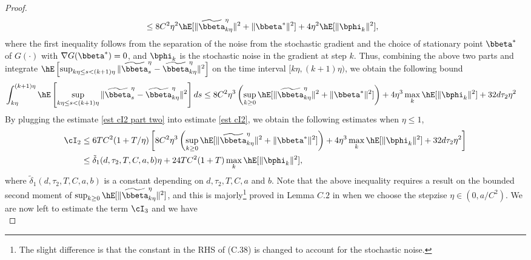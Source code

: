 \begin{proof}
\begin{equation*}
\begin{split}
   &\le 8C^2\eta^2\hE[\|\widetilde \bbeta^{\eta}_{k\eta}\|^2+\|\bbeta^*\|^2]+4\eta^2\hE[\|\bphi_k\|^2 ],
    \end{split}{}
\end{equation*}
where the first inequality follows from the separation of the noise from the stochastic gradient and the choice of stationary point $\bbeta^*$ of $G(\cdot)$ with $\nabla G(\bbeta^*)=0$, and $\bphi_k$ is the stochastic noise in the gradient at step $k$. Thus, combining the above two parts and integrate $ \hE\left[\sup_{k\eta\le s<(k+1)\eta}  \| \widetilde \bbeta^{\eta}_s-\widetilde \bbeta^{\eta}_{k\eta}\|^2 \right]$ on the time interval $[k\eta,(k+1)\eta)$, we obtain the following bound 
\begin{equation}\label{est cI2 part two}
    \begin{split}
        \int_{k\eta}^{(k+1)\eta}  \hE\left[\sup_{k\eta\le s<(k+1)\eta}  \| \widetilde \bbeta^{\eta}_s-\widetilde \bbeta^{\eta}_{k\eta}\|^2 \right] ds&\le 8C^2\eta^3 \left(\sup_{k\ge 0}\hE[ \|\widetilde \bbeta_{k\eta}^{\eta}\|^2+ \|\bbeta^*\|^2] \right)+4\eta^3 \max_{k}\hE[\|\bphi_k\|^2]+32d\tau_2\eta^2
    \end{split}{}
\end{equation}{}
By plugging the estimate \eqref{est cI2 part two} into estimate \eqref{est cI2}, we obtain the following estimates when $\eta\le 1$,
\begin{equation}
    \begin{split}
        \cI_2&\le 6TC^2(1+T/\eta)\left[8C^2\eta^3 \left(\sup_{k\ge 0}\hE[ \|\widetilde \bbeta_{k\eta}^{\eta}\|^2+\|\bbeta^*\|^2] \right)+4\eta^3 \max_{k}\hE[\|\bphi_k\|^2]+32d\tau_2\eta^2\right]\\
        & \le \tilde \delta_1(d, \tau_2, T, C, a, b) \eta + 24TC^2(1+T)\max_{k}\hE[\|\bphi_k\|^2],
    \end{split}{}
\end{equation}{}
where $\tilde \delta_1(d, \tau_2, T, C, a, b)$ is a constant depending on $d, \tau_2, T, C, a$ and $b$. Note that the above inequality requires a result on the bounded second moment of   $\sup_{k\ge 0}\hE[ \|\widetilde \bbeta_{k\eta}^{\eta}\|^2]$, and this is majorly\footnote{The slight difference is that the constant in the RHS of (C.38) \citet{chen2018accelerating} is changed to account for the stochastic noise.} proved in Lemma $C.2$ in \citet{chen2018accelerating} when we choose the stepzise $\eta\in (0, a/C^2)$. We are now left to estimate the term $\cI_3$ and we have
\begin{equation}

\end{equation}
\end{proof}
